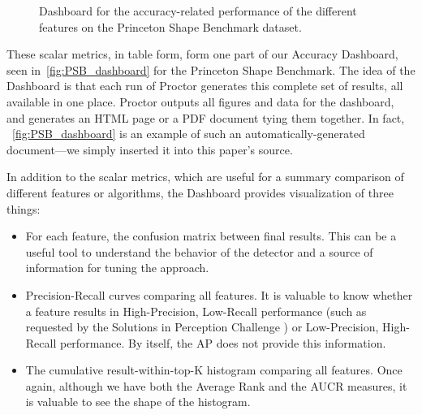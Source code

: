 \begin{figure}[thpb]
   \hfill
  \caption{Dashboard for the accuracy-related performance of the different features on the Princeton Shape Benchmark dataset.}
  \label{fig:PSB_dashboard}
\end{figure}

These scalar metrics, in table form, form one part of our Accuracy Dashboard, seen in~\autoref{fig:PSB_dashboard} for the Princeton Shape Benchmark.
The idea of the Dashboard is that each run of Proctor generates this complete set of results, all available in one place.
Proctor outputs all figures and data for the dashboard, and generates an HTML page or a PDF document tying them together.
In fact, ~\autoref{fig:PSB_dashboard} is an example of such an automatically-generated document---we simply inserted it into this paper's source.

In addition to the scalar metrics, which are useful for a summary comparison of different features or algorithms, the Dashboard provides visualization of three things:
\begin{itemize}
  \item For each feature, the confusion matrix between final results. This can be a useful tool to understand the behavior of the detector and a source of information for tuning the approach.
  \item Precision-Recall curves comparing all features. It is valuable to know whether a feature results in High-Precision, Low-Recall performance (such as requested by the Solutions in Perception Challenge \cite{SIPC2011}) or Low-Precision, High-Recall performance. By itself, the AP does not provide this information.
  \item The cumulative result-within-top-K histogram comparing all features. Once again, although we have both the Average Rank and the AUCR measures, it is valuable to see the shape of the histogram.
\end{itemize}

